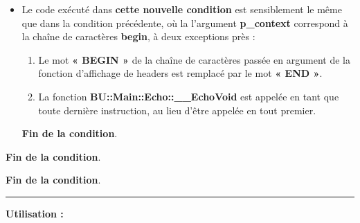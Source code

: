 \documentclass[a4paper,10pt]{article}
\begin{document}
\begin{itemize}
{        \begin{itemize}
            \item
            {
                \begin{justify}\setlength{\parskip}{1em}
                    Le code exécuté dans \textbf{\color{brick}cette nouvelle condition} est sensiblement le même que dans la condition précédente, où la l'argument \textbf{\color{orange}p\_context} correspond à la chaîne de caractères \textbf{begin}, à deux exceptions près :
                    
                    \begin{enumerate}
                        \item Le mot \textbf{« BEGIN »} de la chaîne de caractères passée en argument de la fonction d'affichage de headers est remplacé par le mot \textbf{« END »}.

                        \item La fonction \textbf{\color{mauve}BU::Main::Echo::\_\_EchoVoid} est appelée en tant que toute dernière instruction, au lieu d'être appelée en tout premier. 
                    \end{enumerate}
                \end{justify}\setlength{\parskip}{1em}
                
                \begin{justify}
                    \textbf{\color{brick}Fin de la condition}.
                \end{justify}
            }
        \end{itemize}

        \begin{justify}\setlength{\parskip}{2em}
            \textbf{\color{brick}Fin de la condition}.
        \end{justify}
    }
\end{itemize}

\begin{justify}\setlength{\parskip}{2em}
    \textbf{\color{brick}Fin de la condition}.
\end{justify}


\par\noindent\rule{\textwidth}{0.4pt}\setlength{\parskip}{1em}

\begin{justify}
    \textbf{Utilisation :}
\end{justify}
\end{document}
